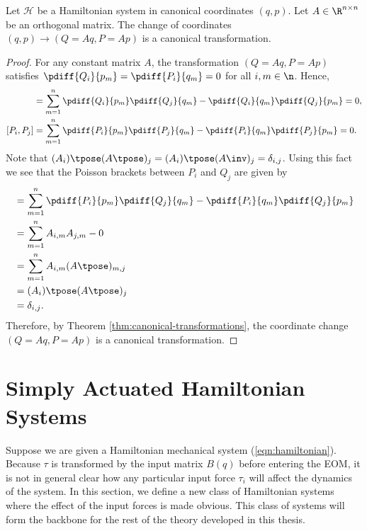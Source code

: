 \begin{lemma}\label{lemma:linear-is-canonical}
    Let \(\mathcal{H}\) be a Hamiltonian system in canonical coordinates
    \((q,p)\).
    Let \(A \in \R^{n\times n}\) be an orthogonal matrix.
    The change of coordinates \((q,p) \to (Q = Aq, P = Ap)\) is a canonical
    transformation.
\end{lemma}
\begin{proof}
    For any constant matrix \(A\), the transformation
    \((Q = Aq, P = Ap)\) satisfies
    \(\pdiff{Q_i}{p_m} = \pdiff{P_i}{q_m} = 0\) for all 
    \(i,m \in \n\).
    Hence, 
    \begin{align*}
        [Q_i,Q_j] &= \sum\limits_{m = 1}^n \pdiff{Q_i}{p_m}\pdiff{Q_j}{q_m} - 
        \pdiff{Q_i}{q_m}\pdiff{Q_j}{p_m} = 0
        , \\
        [P_i,P_j] &= \sum\limits_{m=1}^n \pdiff{P_i}{p_m}\pdiff{P_j}{q_m} -
        \pdiff{P_i}{q_m}\pdiff{P_j}{p_m} = 0
        .
    \end{align*}
    Note that \((A_i)\tpose (A\tpose)_j = (A_i)\tpose (A\inv)_j = \delta_{i,j}\). 
    Using this fact we see that the Poisson brackets between \(P_i\) and \(Q_j\)
    are given by
    \begin{align*}
        [P_i,Q_j] &= \sum\limits_{m=1}^n\pdiff{P_i}{p_m}\pdiff{Q_j}{q_m}
        - \pdiff{P_i}{q_m}\pdiff{Q_j}{p_m} \\
                  &= \sum\limits_{m=1}^n A_{i,m}A_{j,m} - 0 \\
                  &= \sum\limits_{m=1}^n A_{i,m}(A\tpose)_{m,j} \\
                  &= (A_i)\tpose (A\tpose)_j \\
                  &= \delta_{i,j}
        .
    \end{align*}
    Therefore, by Theorem \ref{thm:canonical-transformations}, the coordinate
    change \((Q = Aq, P = Ap)\) is a canonical transformation.
\end{proof}

\section{Simply Actuated Hamiltonian Systems}\label{sec:simply-actuated}
Suppose we are given a Hamiltonian mechanical system (\ref{eqn:hamiltonian}).
Because \(\tau\) is transformed by the input matrix \(B(q)\) before
entering the EOM, it is not in general clear how any particular input force \(\tau_i\)
will affect the dynamics of the system. 
In this section, we define a new class of Hamiltonian systems where the effect
of the input forces is made obvious. This class of
systems will form the backbone for the rest of the theory developed in this
thesis.

